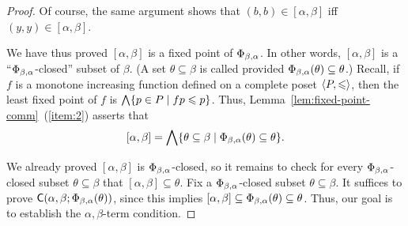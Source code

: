 \begin{proof}
    Of course, the same argument shows that 
    $(b,b)\in [\alpha, \beta]$ iff $(y,y)\in [\alpha, \beta]$.

    We have thus proved $[\alpha, \beta]$ is a fixed point of $\Phi_{\beta, \alpha}$.
    In other words, 
    $[\alpha, \beta]$ is a ``$\Phi_{\beta, \alpha}$-closed'' subset of $\beta$.
    (A set $\theta\subseteq \beta$ is called  provided
    $\Phi_{\beta, \alpha}(\theta) \subseteq \theta$.)
    Recall, if $f$ is a monotone increasing function defined on a
    complete poset $\langle P, \leqslant\rangle$, then the least fixed point of $f$
    is $\bigwedge \{ p\in P \mid f p \leqslant p\}$. %
    Thus,
    Lemma~\ref{lem:fixed-point-comm}~(\ref{item:2}) asserts that
    \begin{equation}
      \label{eq:2}
            [\alpha, \beta] =\bigwedge \{ \theta \subseteq \beta \mid \Phi_{\beta, \alpha}(\theta) \subseteq \theta\}.
    \end{equation}

    We already proved $[\alpha, \beta]$ is
    $\Phi_{\beta, \alpha}$-closed, so it remains to check for every $\Phi_{\beta, \alpha}$-closed subset
    $\theta\subseteq \beta$ that $[\alpha, \beta] \subseteq \theta$.
    Fix a $\Phi_{\beta, \alpha}$-closed subset $\theta\subseteq \beta$. %
    It suffices to prove $\mathsf{C}(\alpha, \beta; \Phi_{\beta, \alpha}(\theta))$, since this implies 
    $[\alpha, \beta] \subseteq \Phi_{\beta, \alpha}(\theta) \subseteq \theta$.
    Thus, our goal is to establish the $\alpha, \beta$-term condition.


\end{proof}
